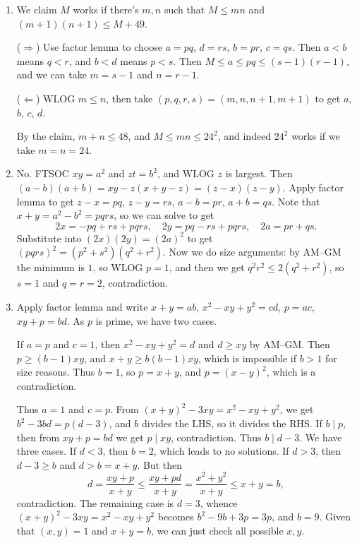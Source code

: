 \documentclass[11pt,paper=letter]{scrartcl}
\begin{document}
\begin{enumerate}
\item We claim $M$ works if there's $m, n$ such that $M \le mn$ and $(m + 1)(n + 1) \le M + 49$.

($\Rightarrow$) Use factor lemma to choose $a = pq$, $d = rs$, $b = pr$, $c = qs$. Then $a < b$ means $q < r$, and $b < d$ means $p < s$. Then $M \le a \le pq \le (s - 1)(r - 1)$, and we can take $m = s - 1$ and $n = r - 1$.

($\Leftarrow$) WLOG $m \le n$, then take $(p, q, r, s) = (m, n, n+1, m+1)$ to get $a$, $b$, $c$, $d$.

By the claim, $m + n \le 48$, and $M \le mn \le 24^2$, and indeed $24^2$ works if we take $m = n = 24$.

\item No. FTSOC $xy = a^2$ and $zt = b^2$, and WLOG $z$ is largest. Then $(a - b)(a + b) = xy - z(x + y - z) = (z - x)(z - y)$. Apply factor lemma to get $z - x = pq$, $z - y = rs$, $a - b = pr$, $a + b = qs$. Note that $x + y = a^2 - b^2 = pqrs$, so we can solve to get \[
  2x = -pq + rs + pqrs, \quad
  2y = pq - rs + pqrs, \quad
  2a = pr + qs.
\]
Substitute into $(2x)(2y) = (2a)^2$ to get $(pqrs)^2 = (p^2 + s^2)(q^2 + r^2)$. Now we do size arguments: by AM--GM the minimum is $1$, so WLOG $p = 1$, and then we get $q^2r^2 \le 2(q^2 + r^2)$, so $s = 1$ and $q = r = 2$, contradiction.

\item Apply factor lemma and write $x + y = ab$, $x^2 - xy + y^2 = cd$, $p = ac$, $xy + p = bd$. As $p$ is prime, we have two cases.

If $a = p$ and $c = 1$, then $x^2 - xy + y^2 = d$ and $d \ge xy$ by AM--GM. Then $p \ge (b - 1)xy$, and $x + y \ge b(b - 1)xy$, which is impossible if $b > 1$ for size reasons. Thus $b = 1$, so $p = x + y$, and $p = (x - y)^2$, which is a contradiction.

Thus $a = 1$ and $c = p$. From $(x + y)^2 - 3xy = x^2 - xy + y^2$, we get $b^2 - 3bd = p(d - 3)$, and $b$ divides the LHS, so it divides the RHS. If $b \mid p$, then from $xy + p = bd$ we get $p \mid xy$, contradiction. Thus $b \mid d - 3$. We have three cases. If $d < 3$, then $b = 2$, which leads to no solutions. If $d > 3$, then $d - 3 \ge b$ and $d > b = x + y$. But then \[
  d = \frac{xy + p}{x + y} \le \frac{xy + pd}{x + y} = \frac{x^2 + y^2}{x + y} \le x + y = b,
\]
contradiction. The remaining case is $d = 3$, whence $(x + y)^2 - 3xy = x^2 - xy + y^2$ becomes $b^2 - 9b + 3p = 3p$, and $b = 9$. Given that $(x, y) = 1$ and $x + y = b$, we can just check all possible $x, y$.

\end{enumerate}
\end{document}
